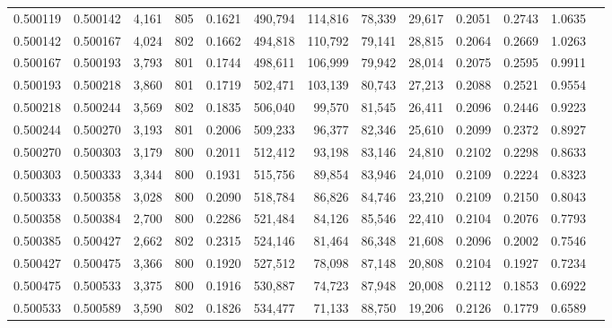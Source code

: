 \begin{tabular}{rrrrrrrrrrrrr}
0.500119 & 0.500142 & 4,161 & 805 &                                     0.1621 & 490,794 & 114,816 &  78,339 &  29,617 & 0.2051 & 0.2743 & 1.0635 \\
0.500142 & 0.500167 & 4,024 & 802 &                                     0.1662 & 494,818 & 110,792 &  79,141 &  28,815 & 0.2064 & 0.2669 & 1.0263 \\
0.500167 & 0.500193 & 3,793 & 801 &                                     0.1744 & 498,611 & 106,999 &  79,942 &  28,014 & 0.2075 & 0.2595 & 0.9911 \\
0.500193 & 0.500218 & 3,860 & 801 &                                     0.1719 & 502,471 & 103,139 &  80,743 &  27,213 & 0.2088 & 0.2521 & 0.9554 \\
0.500218 & 0.500244 & 3,569 & 802 &                                     0.1835 & 506,040 &  99,570 &  81,545 &  26,411 & 0.2096 & 0.2446 & 0.9223 \\
0.500244 & 0.500270 & 3,193 & 801 &                                     0.2006 & 509,233 &  96,377 &  82,346 &  25,610 & 0.2099 & 0.2372 & 0.8927 \\
0.500270 & 0.500303 & 3,179 & 800 &                                     0.2011 & 512,412 &  93,198 &  83,146 &  24,810 & 0.2102 & 0.2298 & 0.8633 \\
0.500303 & 0.500333 & 3,344 & 800 &                                     0.1931 & 515,756 &  89,854 &  83,946 &  24,010 & 0.2109 & 0.2224 & 0.8323 \\
0.500333 & 0.500358 & 3,028 & 800 &                                     0.2090 & 518,784 &  86,826 &  84,746 &  23,210 & 0.2109 & 0.2150 & 0.8043 \\
0.500358 & 0.500384 & 2,700 & 800 &                                     0.2286 & 521,484 &  84,126 &  85,546 &  22,410 & 0.2104 & 0.2076 & 0.7793 \\
0.500385 & 0.500427 & 2,662 & 802 &                                     0.2315 & 524,146 &  81,464 &  86,348 &  21,608 & 0.2096 & 0.2002 & 0.7546 \\
0.500427 & 0.500475 & 3,366 & 800 &                                     0.1920 & 527,512 &  78,098 &  87,148 &  20,808 & 0.2104 & 0.1927 & 0.7234 \\
0.500475 & 0.500533 & 3,375 & 800 &                                     0.1916 & 530,887 &  74,723 &  87,948 &  20,008 & 0.2112 & 0.1853 & 0.6922 \\
0.500533 & 0.500589 & 3,590 & 802 &                                     0.1826 & 534,477 &  71,133 &  88,750 &  19,206 & 0.2126 & 0.1779 & 0.6589 \\

\end{tabular}
